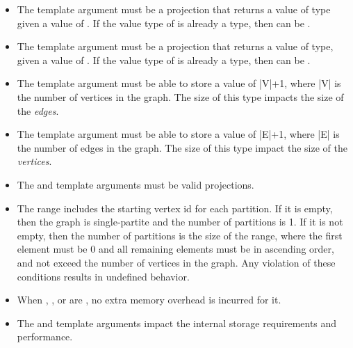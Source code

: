 \begin{itemdescr}
    \pnum\mandates
        \begin{itemize}
            \item The  template argument must be a projection that returns a value of  type
                  given a value of . If the value type of  is already a  type, 
                  then  can be .
            \item The  template argument must be a projection that returns a value of  type,
                  given a value of . If the value type of  is already a  type, 
                  then  can be .
        \end{itemize}
    \pnum\preconditions
        \begin{itemize}
            \item The  template argument must be able to store a value of |V|+1, where |V| is the
                  number of vertices in the graph. The size of this type impacts the size of the \textit{edges}.
            \item The  template argument must be able to store a value of |E|+1, where |E| is the
                  number of edges in the graph. The size of this type impact the size of the \textit{vertices}.
            \item The  and  template arguments must be valid projections.
            \item The  range includes the starting vertex id for each partition. If it is empty, then the graph is single-partite
                    and the number of partitions is 1. If it is not empty, then the number of partitions is the size of the range, where the first element
                    must be 0 and all remaining elements must be in ascending order, and not exceed the number of vertices in the graph. Any
                    violation of these conditions results in undefined behavior.
        \end{itemize}
    \pnum\effects
        \begin{itemize}
            \item When , , or  are , no extra memory overhead is incurred for it.
            \item The  and  template arguments impact the internal storage requirements and performance.

\end{itemize}
\end{itemdescr}
